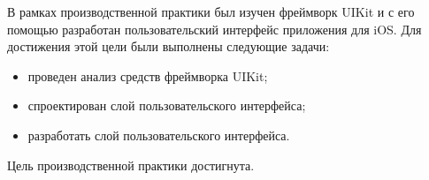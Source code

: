 
В рамках производственной практики был изучен фреймворк UIKit и с его помощью разработан пользовательский интерфейс приложения для iOS. Для достижения этой цели были выполнены следующие задачи:

\begin{itemize}
	\item проведен анализ средств фреймворка UIKit;
	\item спроектирован слой пользовательского интерфейса;
	\item разработать слой пользовательского интерфейса.
\end{itemize}

Цель производственной практики достигнута.
